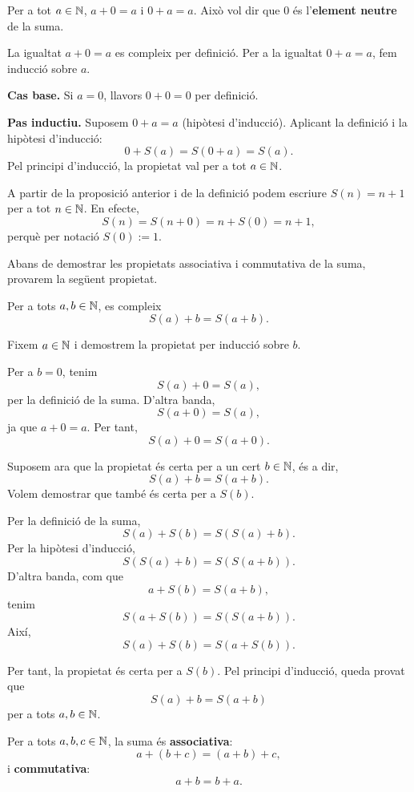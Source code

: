 \begin{proposicio}
Per a tot $a\in \mathbb{N}$, $a+0=a$ i $0+a=a$. Això vol dir que $0$ és l'\textbf{element neutre} de la suma.
\end{proposicio}

\begin{prova}
La igualtat $a+0=a$ es compleix per definició. Per a la igualtat $0+a=a$, fem inducció sobre $a$.

\textbf{Cas base.} Si $a=0$, llavors $0+0=0$ per definició.

\textbf{Pas inductiu.} Suposem $0+a=a$ (hipòtesi d'inducció). Aplicant la definició i la hipòtesi d'inducció:
\[
0+S(a)=S(0+a)=S(a).
\]
Pel principi d'inducció, la propietat val per a tot $a\in \mathbb{N}$.
\end{prova}

\begin{observacio}\label{2}
A partir de la proposició anterior i de la definició podem escriure $S(n)=n+1$ per a tot $n\in \mathbb{N}$. En efecte,
\[
S(n)=S(n+0)=n+S(0)=n+1,
\]
perquè per notació $S(0):=1$.
\end{observacio}

Abans de demostrar les propietats associativa i commutativa de la suma, provarem la següent propietat.

\begin{proposicio}\label{prop:successor-suma}
Per a tots $a,b\in\mathbb{N}$, es compleix
\[
S(a)+b=S(a+b).
\]
\end{proposicio}

\begin{prova}
Fixem $a\in\mathbb{N}$ i demostrem la propietat per inducció sobre $b$.

Per a $b=0$, tenim
\[
S(a)+0=S(a),
\]
per la definició de la suma. D'altra banda,
\[
S(a+0)=S(a),
\]
ja que $a+0=a$. Per tant,
\[
S(a)+0=S(a+0).
\]

Suposem ara que la propietat és certa per a un cert $b\in\mathbb{N}$, és a dir,
\[
S(a)+b=S(a+b).
\]
Volem demostrar que també és certa per a $S(b)$.

Per la definició de la suma,
\[
S(a)+S(b)=S(S(a)+b).
\]
Per la hipòtesi d'inducció,
\[
S(S(a)+b)=S(S(a+b)).
\]
D'altra banda, com que
\[
a+S(b)=S(a+b),
\]
tenim
\[
S(a+S(b))=S(S(a+b)).
\]
Així,
\[
S(a)+S(b)=S(a+S(b)).
\]

Per tant, la propietat és certa per a $S(b)$. Pel principi d'inducció, queda provat que
\[
S(a)+b=S(a+b)
\]
per a tots $a,b\in\mathbb{N}$.
\end{prova}

\begin{proposicio}
Per a tots $a,b,c\in \mathbb{N}$, la suma és \textbf{associativa}:
\[
a+(b+c)=(a+b)+c,
\]
i \textbf{commutativa}:
\[
a+b=b+a.
\]
\end{proposicio}

